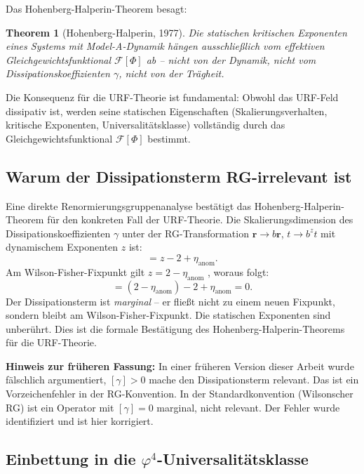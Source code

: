 \documentclass[12pt,a4paper]{article}
\newtheorem{theorem}{Theorem}[section]
\theoremstyle{definition}
\begin{document}
Das Hohenberg-Halperin-Theorem \cite{Hohenberg1977} besagt:

\begin{theorem}[Hohenberg-Halperin, 1977]
Die statischen kritischen Exponenten eines Systems mit
Model-A-Dynamik hängen \emph{ausschließlich} vom effektiven
Gleichgewichtsfunktional $\mathcal{F}[\Phi]$ ab -- nicht von der
Dynamik, nicht vom Dissipationskoeffizienten $\gamma$, nicht von
der Trägheit.
\end{theorem}

\noindent
Die Konsequenz für die URF-Theorie ist fundamental: Obwohl das URF-Feld
dissipativ ist, werden seine statischen Eigenschaften (Skalierungsverhalten,
kritische Exponenten, Universalitätsklasse) vollständig durch das
Gleichgewichtsfunktional $\mathcal{F}[\Phi]$ bestimmt.

\subsection{Warum der Dissipationsterm RG-irrelevant ist}

Eine direkte Renormierungsgruppenanalyse bestätigt das Hohenberg-Halperin-Theorem
für den konkreten Fall der URF-Theorie. Die Skalierungsdimension des
Dissipationskoeffizienten $\gamma$ unter der RG-Transformation
$\mathbf{r} \to b\mathbf{r}$, $t \to b^z t$ mit dynamischem Exponenten
$z$ ist:
\begin{equation}
  [\gamma] = z - 2 + \eta_{\mathrm{anom}}.
\end{equation}
Am Wilson-Fisher-Fixpunkt gilt $z = 2 - \eta_{\mathrm{anom}}$
\cite{Hohenberg1977}, woraus folgt:
\begin{equation}
  [\gamma] = (2 - \eta_{\mathrm{anom}}) - 2 + \eta_{\mathrm{anom}} = 0.
\end{equation}
Der Dissipationsterm ist \emph{marginal} -- er fließt nicht zu einem
neuen Fixpunkt, sondern bleibt am Wilson-Fisher-Fixpunkt. Die statischen
Exponenten sind unberührt. Dies ist die formale Bestätigung des
Hohenberg-Halperin-Theorems für die URF-Theorie.

\textbf{Hinweis zur früheren Fassung:} In einer früheren Version dieser
Arbeit wurde fälschlich argumentiert, $[\gamma] > 0$ mache den
Dissipationsterm relevant. Das ist ein Vorzeichenfehler in der RG-Konvention.
In der Standardkonvention (Wilsonscher RG) ist ein Operator mit
$[\gamma] = 0$ marginal, nicht relevant. Der Fehler wurde identifiziert
und ist hier korrigiert.

\subsection{Einbettung in die \texorpdfstring{$\varphi^4$}{phi4}-Universalitätsklasse}
\end{document}
